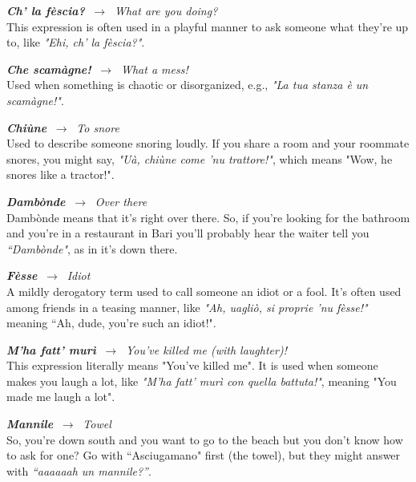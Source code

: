\documentclass[
	openany, %
	parskip=full, %
	12pt, %
	a4paper, %
]{conferencebooklet} %
\begin{document}
\begin{adjustwidth}{8pt}{12pt}
\begin{multicols}{2}
    \RaggedRight
    \textbf{\textit{Ch’ la fèscia?}} $\ \rightarrow \ $ \textit{What are you doing?} \\
    \justifying
    This expression is often used in a playful manner to ask someone what they're up to, like \textit{"Ehi, ch’ la fèscia?"}.

    \RaggedRight
    \textbf{\textit{Che scamàgne!}} $\ \rightarrow \ $ \textit{What a mess!} \\
    \justifying
    Used when something is chaotic or disorganized, e.g., \textit{"La tua stanza è un scamàgne!"}.

    \RaggedRight
    \textbf{\textit{Chiùne}} $\ \rightarrow \ $ \textit{To snore} \\
    \justifying
    Used to describe someone snoring loudly. If you share a room and your roommate snores, you might say, \textit{"Uà, chiùne come 'nu trattore!"}, which means "Wow, he snores like a tractor!".

    \RaggedRight
    \textbf{\textit{Dambònde}} $\ \rightarrow \ $ \textit{Over there} \\
    \justifying
    Dambònde means that it’s right over there. So, if you’re looking for the bathroom and you’re in a restaurant in Bari you’ll probably hear the waiter tell you \textit{“Dambònde"}, as in it’s down there.

    \RaggedRight
    \textbf{\textit{Fèsse}} $\ \rightarrow \ $ \textit{Idiot} \\
    \justifying
    A mildly derogatory term used to call someone an idiot or a fool. It’s often used among friends in a teasing manner, like \textit{"Ah, uagliò, si proprie 'nu fèsse!"} meaning “Ah, dude, you’re such an idiot!".

    \RaggedRight
    \textbf{\textit{M’ha fatt’ murì}} $\ \rightarrow \ $ \textit{You’ve killed me (with laughter)!} \\
    \justifying
    This expression literally means "You’ve killed me". It is used when someone makes you laugh a lot, like \textit{"M’ha fatt’ murì con quella battuta!"}, meaning "You made me laugh a lot".

    \RaggedRight
    \textbf{\textit{Mannile}} $\ \rightarrow \ $ \textit{Towel} \\
    \justifying
    So, you’re down south and you want to go to the beach but you don’t know how to ask for one? Go with “Asciugamano" first (the towel), but they might answer with \textit{“aaaaaah un mannile?”}.
\end{multicols}
\end{adjustwidth}
\end{document}
